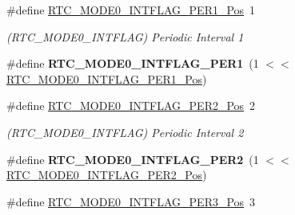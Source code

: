 \begin{DoxyCompactItemize}
\item 
\hypertarget{group___s_a_m_l21___r_t_c_gab2ec5df6b8c10c74089a9e23d46a721a}{}\#define \hyperlink{group___s_a_m_l21___r_t_c_gab2ec5df6b8c10c74089a9e23d46a721a}{R\+T\+C\+\_\+\+M\+O\+D\+E0\+\_\+\+I\+N\+T\+F\+L\+A\+G\+\_\+\+P\+E\+R1\+\_\+\+Pos}~1\label{group___s_a_m_l21___r_t_c_gab2ec5df6b8c10c74089a9e23d46a721a}

\begin{DoxyCompactList}\small\item\em (R\+T\+C\+\_\+\+M\+O\+D\+E0\+\_\+\+I\+N\+T\+F\+L\+A\+G) Periodic Interval 1 \end{DoxyCompactList}\item 
\hypertarget{group___s_a_m_l21___r_t_c_gaa92d6417ee19465e37b2325e8c7f0231}{}\#define {\bfseries R\+T\+C\+\_\+\+M\+O\+D\+E0\+\_\+\+I\+N\+T\+F\+L\+A\+G\+\_\+\+P\+E\+R1}~(1 $<$$<$ \hyperlink{group___s_a_m_l21___r_t_c_gab2ec5df6b8c10c74089a9e23d46a721a}{R\+T\+C\+\_\+\+M\+O\+D\+E0\+\_\+\+I\+N\+T\+F\+L\+A\+G\+\_\+\+P\+E\+R1\+\_\+\+Pos})\label{group___s_a_m_l21___r_t_c_gaa92d6417ee19465e37b2325e8c7f0231}

\item 
\hypertarget{group___s_a_m_l21___r_t_c_gad32611363a5ca025c248e102a33456b1}{}\#define \hyperlink{group___s_a_m_l21___r_t_c_gad32611363a5ca025c248e102a33456b1}{R\+T\+C\+\_\+\+M\+O\+D\+E0\+\_\+\+I\+N\+T\+F\+L\+A\+G\+\_\+\+P\+E\+R2\+\_\+\+Pos}~2\label{group___s_a_m_l21___r_t_c_gad32611363a5ca025c248e102a33456b1}

\begin{DoxyCompactList}\small\item\em (R\+T\+C\+\_\+\+M\+O\+D\+E0\+\_\+\+I\+N\+T\+F\+L\+A\+G) Periodic Interval 2 \end{DoxyCompactList}\item 
\hypertarget{group___s_a_m_l21___r_t_c_ga9594020ba216e2eeec1421fce3697f61}{}\#define {\bfseries R\+T\+C\+\_\+\+M\+O\+D\+E0\+\_\+\+I\+N\+T\+F\+L\+A\+G\+\_\+\+P\+E\+R2}~(1 $<$$<$ \hyperlink{group___s_a_m_l21___r_t_c_gad32611363a5ca025c248e102a33456b1}{R\+T\+C\+\_\+\+M\+O\+D\+E0\+\_\+\+I\+N\+T\+F\+L\+A\+G\+\_\+\+P\+E\+R2\+\_\+\+Pos})\label{group___s_a_m_l21___r_t_c_ga9594020ba216e2eeec1421fce3697f61}

\item 
\hypertarget{group___s_a_m_l21___r_t_c_ga4ec3dbad46e263fe7e6cf87d8e866493}{}\#define \hyperlink{group___s_a_m_l21___r_t_c_ga4ec3dbad46e263fe7e6cf87d8e866493}{R\+T\+C\+\_\+\+M\+O\+D\+E0\+\_\+\+I\+N\+T\+F\+L\+A\+G\+\_\+\+P\+E\+R3\+\_\+\+Pos}~3\label{group___s_a_m_l21___r_t_c_ga4ec3dbad46e263fe7e6cf87d8e866493}


\end{DoxyCompactItemize}
